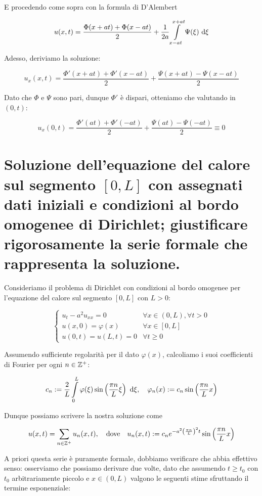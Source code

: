 \documentclass{article}
\begin{document}
E procedendo come sopra con la formula di D'Alembert

\[u(x,t) = \frac{\Phi(x+at) + \Phi(x-at) }{2} + \frac{1}{2a} \intop_{x-at}^{x+at} \Psi(\xi)\de \xi \]

Adesso, deriviamo la soluzione:

\[ u_x(x,t) = \frac{\Phi'(x+at) + \Phi'(x-at)}{2} + \frac{\Psi(x+at) - \Psi(x-at)}{2} \]

Dato che $\Phi$ e $\Psi$ sono pari, dunque $\Phi'$ è dispari, otteniamo che valutando in $(0,t)$:

\[ u_x(0,t) = \frac{\Phi'(at) + \Phi'(-at)}{2} + \frac{\Psi(at) - \Psi(-at)}{2} \equiv 0\]

\section{Soluzione dell'equazione del calore sul segmento $[0,L]$ con assegnati dati iniziali e condizioni
al bordo omogenee di Dirichlet; giustificare rigorosamente la serie formale che rappresenta la
soluzione.}

Consideriamo il problema di Dirichlet con condizioni al bordo omogenee per l'equazione del calore sul segmento $[0,L]$ con $L>0$:

\[ \begin{cases} u_t - a^2 u_{xx} = 0 & \forall x \in (0,L), \forall t > 0 \\ u(x,0) = \varphi(x) & \forall x \in [0,L] \\ u(0,t) = u(L,t) = 0 & \forall t \ge 0 \end{cases}\]

Assumendo sufficiente regolarità per il dato $\varphi(x)$, calcoliamo i suoi coefficienti di Fourier per ogni $n \in \mathbb{Z}^+$:

\[ c_n := \frac{2}{L}\intop_0^L \varphi(\xi) \sin\left( \frac{\pi n}{L}\xi \right)\de\xi, \quad \varphi_n (x) := c_n \sin\left( \frac{\pi n}{L}x \right) \]

Dunque possiamo scrivere la nostra soluzione come 

\[ u(x,t) = \sum_{n\in \mathbb{Z}^{+}} u_n(x,t), \quad \text{dove}\quad u_n(x,t) := c_n e^{- a^2 \left( \frac{\pi n}{L}\right)^2 t }\sin \left( \frac{\pi n}{L}x \right)\]

A priori questa serie è puramente formale, dobbiamo verificare che abbia effettivo senso: osserviamo che possiamo derivare due volte, dato che assumendo $t \ge t_0$ con $t_0$ arbitrariamente piccolo e $x \in (0,L)$ valgono le seguenti stime sfruttando il termine esponenziale:
\end{document}
